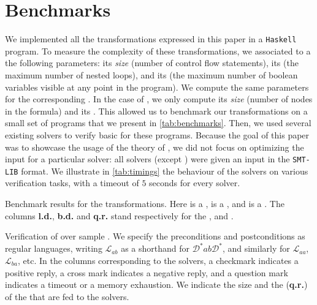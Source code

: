 \section{Benchmarks}
\label{sec:benchmarks}

\AP We implemented all the transformations expressed in this paper in a
\texttt{Haskell} program. To measure the complexity of these transformations,
we associated to a  the following parameters: its
\emph{size} (number of control flow statements), its  (the
maximum number of nested loops), and its  (the maximum
number of boolean variables visible at any point in the program). We compute
the same parameters for the corresponding . In the case
of , we only compute its \emph{size} (number of
nodes in the formula) and its . This allowed us to
benchmark our transformations on a small set of programs that we present in
\cref{tab:benchmarks}. Then, we used several existing solvers to verify basic
 for these programs. Because the goal of this
paper was to showcase the usage of the theory of , we
did not focus on optimizing the input for a particular solver: all solvers
(except ) were given an input in the \texttt{SMT-LIB} format. We
illustrate in \cref{tab:timings} the behaviour of the solvers on various
verification tasks, with a timeout of $5$ seconds for every solver.

\begin{table}[t]
    \caption{Benchmark results for the transformations. 
        Here  is a ,
         is a ,
        and  is a .
        The columns \textbf{l.d.}, \textbf{b.d.} and \textbf{q.r.}
        stand respectively for the , 
         and .
    }
    \label{tab:benchmarks}
    \centering
    
\end{table}

\begin{table}
    \caption{Verification of  over 
        sample . We specify the preconditions and postconditions
        as regular languages, writing $\mathcal{L}_{ab}$ as a shorthand
        for $\mathcal{D}^*ab\mathcal{D}^*$,
        and similarly for $\mathcal{L}_{aa}$, $\mathcal{L}_{ba}$, etc.
        In the columns corresponding to the solvers, a checkmark
        indicates a positive reply,
        a cross mark indicates a negative reply,
        and a question mark indicates a timeout
        or a memory exhaustion.
        We indicate the size and the  (\textbf{q.r.})
        of the  that are fed to the solvers.
    }
    \label{tab:timings}
    \centering
    
\end{table}

